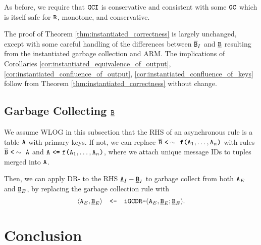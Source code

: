\documentclass{article}
\numberwithin{equation}{section}
\renewcommand{\tt}[1]{\ifmmode\text{\texttt{#1}}\else\texttt{#1}\fi}
\begin{document}
As before, we require that $\tt{GCI}$ is conservative and consistent with some $\tt{GC}$ which is itself safe for $\tt{R}$, monotone, and conservative.

The proof of Theorem \ref{thm:instantiated_correctness} is largely unchanged, except with some careful handling of the differences between $\overline{\tt{B}}_I$ and $\underline{\tt{B}}$ resulting from the instantiated garbage collection and ARM.
The implications of Corollaries \ref{cor:instantiated_equivalence_of_output}, \ref{cor:instantiated_confluence_of_output}, \ref{cor:instantiated_confluence_of_keys} follow from Theorem \ref{thm:instantiated_correctness} without change.



\subsection{Garbage Collecting $\underline{\tt{B}}$}
We assume WLOG in this subsection that the RHS of an asynchronous rule is a table $\tt{A}$ with primary keys.
If not, we can replace $\overline{\tt{B}} ~\tt{<}\sim~ \tt{f}\tt{(}\tt{A}_1, \dots, \tt{A}_n\tt{)}$ with rules $\overline{\tt{B}} ~\tt{<}\sim~ \tt{A}$ and $\tt{A} ~\tt{<=}~ \tt{f}\tt{(}\tt{A}_1, \dots, \tt{A}_n\tt{)}$, where we attach unique message IDs to tuples merged into $\tt{A}$.

Then, we can apply DR- to the RHS $\tt{A}_I - \underline{\tt{B}}_I$ to garbage collect from both $\tt{A}_E$ and $\underline{\tt{B}}_E$, by replacing the garbage collection rule with
\[
\langle \tt{A}_E, \underline{\tt{B}}_E \rangle \quad\tt{<-}\quad \tt{iGCDR-}(\tt{A}_E, \underline{\tt{B}}_E; \underline{\tt{B}}_E).
\]






\section{Conclusion}
\label{sec:conclude}







\end{document}
